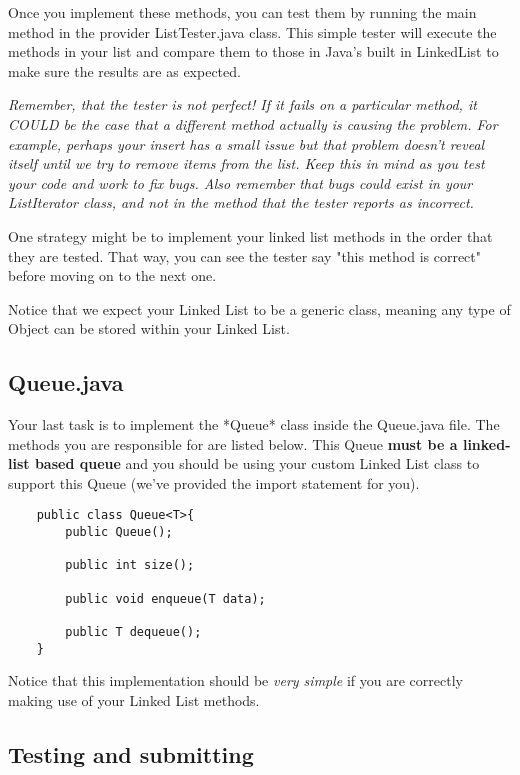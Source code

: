 \documentclass[paper=a4, fontsize=11pt, parskip=full]{scrartcl} %
\numberwithin{equation}{section} %
\numberwithin{figure}{section} %
\numberwithin{table}{section} %
\begin{document}
Once you implement these methods, you can test them by running the main method in the provider ListTester.java class. This simple tester will execute the methods in your list and compare them to those in Java's built in LinkedList to make sure the results are as expected.

\emph{Remember, that the tester is not perfect! If it fails on a particular method, it COULD be the case that a different method actually is causing the problem. For example, perhaps your insert has a small issue but that problem doesn't reveal itself until we try to remove items from the list. Keep this in mind as you test your code and work to fix bugs. Also remember that bugs could exist in your ListIterator class, and not in the method that the tester reports as incorrect.}

One strategy might be to implement your linked list methods in the order that they are tested. That way, you can see the tester say "this method is correct" before moving on to the next one.

Notice that we expect your Linked List to be a generic class, meaning any type of Object can be stored within your Linked List.


\subsection{Queue.java}

Your last task is to implement the *Queue* class inside the Queue.java file. The methods you are responsible for are listed below. This Queue \textbf{must be a linked-list based queue} and you should be using your custom Linked List class to support this Queue (we've provided the import statement for you).

\begin{lstlisting}
	public class Queue<T>{
		public Queue();

		public int size();

		public void enqueue(T data);

		public T dequeue();
	}
\end{lstlisting}

Notice that this implementation should be \emph{very simple} if you are correctly making use of your Linked List methods.

\subsection{Testing and submitting}
\end{document}
